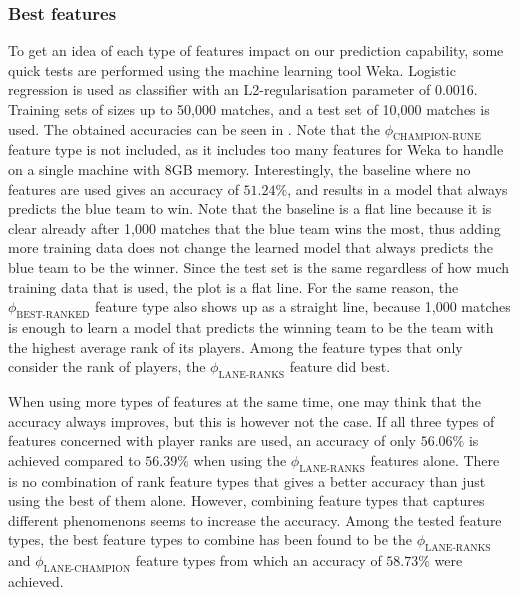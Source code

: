 \subsubsection{Best features}
\label{sec:best-features}
To get an idea of each type of features impact on our prediction capability, some quick tests are performed using the machine learning tool Weka.
Logistic regression is used as classifier with an L2-regularisation parameter of 0.0016. Training sets of sizes up to 50,000 matches, and a test set of 10,000 matches is used. 
The obtained accuracies can be seen in . Note that the $\phi_\text{CHAMPION-RUNE}$ feature type is not included, as it includes too many features for Weka to handle on a single machine with 8GB memory.
Interestingly, the baseline where no features are used gives an accuracy of $51.24 \%$, and results in a model that always predicts the blue team to win.
Note that the baseline is a flat line because it is clear already after 1,000 matches that the blue team wins the most, thus adding more training data does not change the learned model that always predicts the blue team to be the winner. Since the test set is the same regardless of how much training data that is used, the plot is a flat line. For the same reason, the $\phi_\text{BEST-RANKED}$ feature type also shows up as a straight line, because 1,000 matches is enough to learn a model that predicts the winning team to be the team with the highest average rank of its players.
Among the feature types that only consider the rank of players, the $\phi_\text{LANE-RANKS}$ feature did best.

When using more types of features at the same time, one may think that the accuracy always improves, but this is however not the case.
If all three types of features concerned with player ranks are used, an accuracy of only $56.06\%$ is achieved compared to $56.39\%$ when using the $\phi_\text{LANE-RANKS}$ features alone. There is no combination of rank feature types that gives a better accuracy than just using the best of them alone.
However, combining feature types that captures different phenomenons seems to increase the accuracy.
Among the tested feature types, the best feature types to combine has been found to be the $\phi_\text{LANE-RANKS}$ and $\phi_\text{LANE-CHAMPION}$ feature types from which an accuracy of $58.73 \%$ were achieved.

